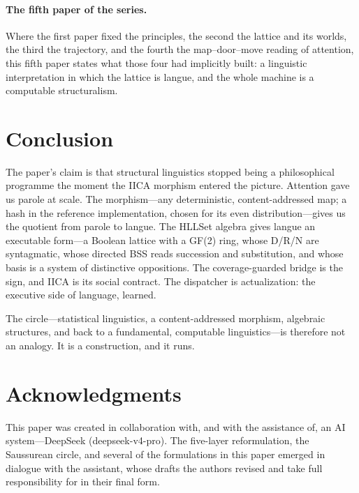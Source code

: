 \documentclass[11pt,a4paper]{article}
\theoremstyle{remark}
\begin{document}
\paragraph{The fifth paper of the series.} Where the first paper
\cite{ewm2026} fixed the principles, the second \cite{companion2026} the
lattice and its worlds, the third \cite{state2026} the trajectory, and the
fourth \cite{attention2026} the map--door--move reading of attention, this
fifth paper states what those four had implicitly built: a linguistic
interpretation in which the lattice is langue, and the whole machine is a
computable structuralism.

\section{Conclusion}
\label{sec:conclusion}

The paper's claim is that structural linguistics stopped being a philosophical
programme the moment the IICA morphism entered the picture. Attention gave us
parole at scale. The morphism---any deterministic, content-addressed map; a
hash in the reference implementation, chosen for its even distribution---gives
us the quotient from parole to langue. The HLLSet algebra gives langue an
executable form---a Boolean lattice with a
GF(2) ring, whose D/R/N are syntagmatic, whose directed BSS reads succession
and substitution, and whose basis is a system of distinctive oppositions. The
coverage-guarded bridge is
the sign, and IICA is its social contract. The dispatcher is actualization:
the executive side of language, learned.

The circle---statistical linguistics, a content-addressed morphism, algebraic
structures, and back to a fundamental, computable linguistics---is therefore
not an analogy. It is a construction, and it runs.

\section*{Acknowledgments}
This paper was created in collaboration with, and with the assistance of, an
AI system---DeepSeek (deepseek-v4-pro). The five-layer reformulation, the
Saussurean circle, and several of the formulations in this paper emerged in
dialogue with the assistant, whose drafts the authors revised and take full
responsibility for in their final form.
\end{document}
